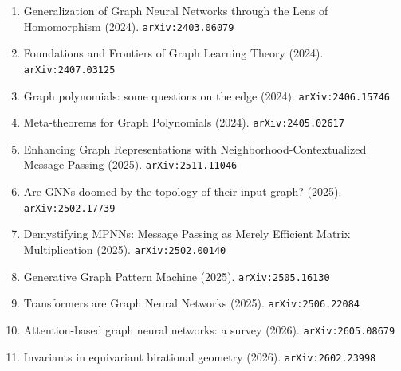 \documentclass[11pt]{article}
\begin{document}
\begin{enumerate}
  Networks (2024). \texttt{arXiv:2403.04482}
  \item Generalization of Graph Neural Networks through the Lens of Homomorphism (2024). \texttt{arXiv:2403.06079}
  \item Foundations and Frontiers of Graph Learning Theory (2024). \texttt{arXiv:2407.03125}
  \item Graph polynomials: some questions on the edge (2024). \texttt{arXiv:2406.15746}
  \item Meta-theorems for Graph Polynomials (2024). \texttt{arXiv:2405.02617}
  \item Enhancing Graph Representations with Neighborhood-Contextualized Message-Passing (2025). \texttt{arXiv:2511.11046}
  \item Are GNNs doomed by the topology of their input graph? (2025). \texttt{arXiv:2502.17739}
  \item Demystifying MPNNs: Message Passing as Merely Efficient Matrix
  Multiplication (2025). \texttt{arXiv:2502.00140}
  \item Generative Graph Pattern Machine (2025). \texttt{arXiv:2505.16130}
  \item Transformers are Graph Neural Networks (2025). \texttt{arXiv:2506.22084}
  \item Attention-based graph neural networks: a survey (2026). \texttt{arXiv:2605.08679}
  \item Invariants in equivariant birational geometry (2026). \texttt{arXiv:2602.23998}
\end{enumerate}
\end{document}
